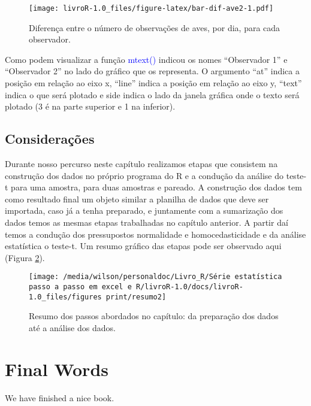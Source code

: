 \documentclass[titlepage, oneside, openany, a4paper]{book}
\begin{document}
\begin{figure}
\centering
\texttt{[image: livroR-1.0\_files/figure-latex/bar-dif-ave2-1.pdf]}
\caption{\label{fig:bar-dif-ave2}Diferença entre o número de observações de aves, por dia, para cada observador.}
\end{figure}

Como podem visualizar a função \textcolor{blue}{mtext()} indicou os nomes ``Observador 1'' e ``Observador 2'' no lado do gráfico que os representa. O argumento ``at'' indica a posição em relação ao eixo x, ``line'' indica a posição em relação ao eixo y, ``text'' indica o que será plotado e side indica o lado da janela gráfica onde o texto será plotado (3 é na parte superior e 1 na inferior).

\hypertarget{considerauxe7uxf5es-2}{%
\section{Considerações}\label{considerauxe7uxf5es-2}}

Durante nosso percurso neste capítulo realizamos etapas que consistem na construção dos dados no próprio programa do R e a condução da análise do teste-t para uma amostra, para duas amostras e pareado. A construção dos dados tem como resultado final um objeto similar a planilha de dados que deve ser importada, caso já a tenha preparado, e juntamente com a sumarização dos dados temos as mesmas etapas trabalhadas no capítulo anterior. A partir daí temos a condução dos pressupostos normalidade e homocedasticidade e da análise estatística o teste-t. Um resumo gráfico das etapas pode ser observado aqui (Figura \ref{fig:resumo3}).

\begin{figure}

{\centering \texttt{[image: /media/wilson/personaldoc/Livro\_R/Série estatística passo a passo em excel e R/livroR-1.0/docs/livroR-1.0\_files/figures print/resumo2]} 

}

\caption{Resumo dos passos abordados no capítulo: da preparação dos dados até a análise dos dados.}\label{fig:resumo3}
\end{figure}

\hypertarget{final-words}{%
\chapter{Final Words}\label{final-words}}

We have finished a nice book.


\end{document}
